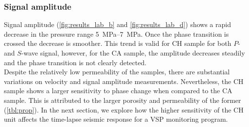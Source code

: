 \subsubsection{Signal amplitude}
Signal amplitude (\cref{fig:results_lab_b} and \cref{fig:results_lab_d}) shows a
rapid decrease in the pressure range \SIrange[range-units =
single]{5}{7}{\mega\pascal}. Once the  phase transition is crossed the
decrease is smoother. This trend is valid for CH sample for both $P$- and
$S$-wave signal, however, for the CA sample, the amplitude decreases steadily
and the phase transition is not clearly detected.\\
Despite the relatively low permeability of the samples, there are substantial
variations on velocity and signal amplitude measurements. Nevertheless, the CH
sample shows a larger sensitivity to  phase change when compared to the
CA sample. This is attributed to the larger porosity and permeability of the
former (\cref{tbl:prop}).
In the next section, we explore how the higher sensitivity of the CH unit
affects the time-lapse seismic response for a VSP monitoring program.
